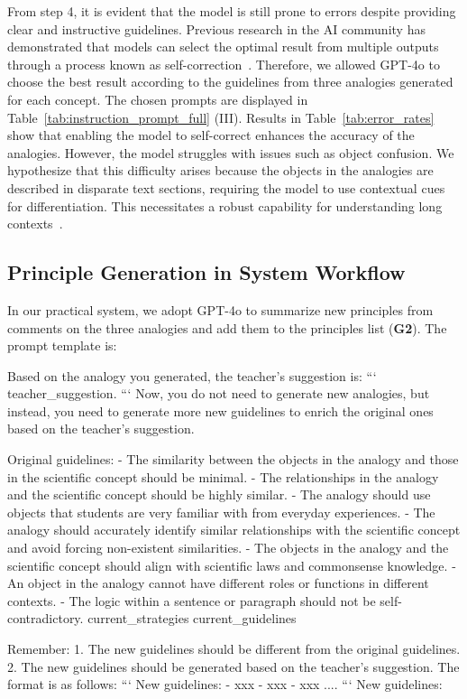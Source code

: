 From step 4, it is evident that the model is still prone to errors despite providing clear and instructive guidelines. 
Previous research in the AI community has demonstrated that models can select the optimal result from multiple outputs through a process known as self-correction~\cite{pan2023automatically,yuan-etal-2023-distilling,liu2024large}. 
Therefore, we allowed GPT-4o to choose the best result according to the guidelines from three analogies generated for each concept. 
The chosen prompts are displayed in Table~\ref{tab:instruction_prompt_full} (III). 
Results in Table~\ref{tab:error_rates} show that enabling the model to self-correct enhances the accuracy of the analogies. 
However, the model struggles with issues such as object confusion. 
We hypothesize that this difficulty arises because the objects in the analogies are described in disparate text sections, requiring the model to use contextual cues for differentiation. 
This necessitates a robust capability for understanding long contexts~\cite{li2024can}. 

\subsection{Principle Generation in System Workflow}
In our practical system, we adopt GPT-4o to summarize new principles from comments on the three analogies and add them to the principles list (\textbf{G2}).
The prompt template is: 
\begin{tcolorbox}[title=The prompt template of principle generation, mybox]
Based on the analogy you generated, the teacher's suggestion is:
```
{teacher_suggestion}.
```
Now, you do not need to generate new analogies, but instead, you need to generate more new guidelines to enrich the original ones based on the teacher's suggestion.

Original guidelines:
- The similarity between the objects in the analogy and those in the scientific concept should be minimal.  
- The relationships in the analogy and the scientific concept should be highly similar. 
- The analogy should use objects that students are very familiar with from everyday experiences. 
- The analogy should accurately identify similar relationships with the scientific concept and avoid forcing non-existent similarities.  
- The objects in the analogy and the scientific concept should align with scientific laws and commonsense knowledge. 
- An object in the analogy cannot have different roles or functions in different contexts.  
- The logic within a sentence or paragraph should not be self-contradictory.  
{current_strategies}
{current_guidelines}

Remember:  
1. The new guidelines should be different from the original guidelines.  
2. The new guidelines should be generated based on the teacher's suggestion.  
The format is as follows:
```
New guidelines:
- xxx
- xxx
- xxx
....
```
New guidelines:
\end{tcolorbox}